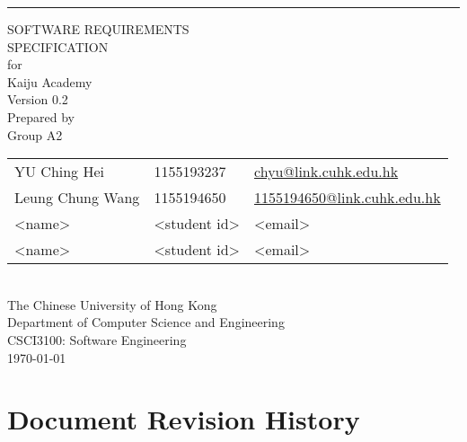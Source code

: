 \documentclass[a4paper, 11pt]{scrreprt}
\date{}
\def\myversion{0.2}
\def\projectname{Kaiju Academy}  %
\begin{document}

\begin{titlepage}
    \begin{flushright}
        \rule{\textwidth}{5pt}\vskip1cm
        \begin{bfseries}
            \Huge{SOFTWARE REQUIREMENTS\\ SPECIFICATION}\\
            \vspace{1.6cm}
            for\\
            \vspace{1.6cm}
            \projectname\\  %
            \vspace{1.6cm}
            \LARGE{Version \myversion}\\
            \vspace{1.6cm}
            Prepared by\\
            Group A2\\
            \begin{tabularx}{\textwidth}{X l X}
            YU Ching Hei & 1155193237 & \href{mailto:chyu@link.cuhk.edu.hk}{chyu@link.cuhk.edu.hk}\\
            Leung Chung Wang & 1155194650 & \href{mailto:1155194650@link.cuhk.edu.hk}{1155194650@link.cuhk.edu.hk}\\
            <name> & <student id> & <email>\\
            <name> & <student id> & <email>\\
            \end{tabularx}\\
            \vspace{1.6cm}
            The Chinese University of Hong Kong\\
            Department of Computer Science and Engineering\\
            CSCI3100: Software Engineering\\
            \vspace{1.6cm}
            \today\\
        \end{bfseries}
    \end{flushright}
\end{titlepage}

\tableofcontents


\chapter{Document Revision History}
\end{document}
